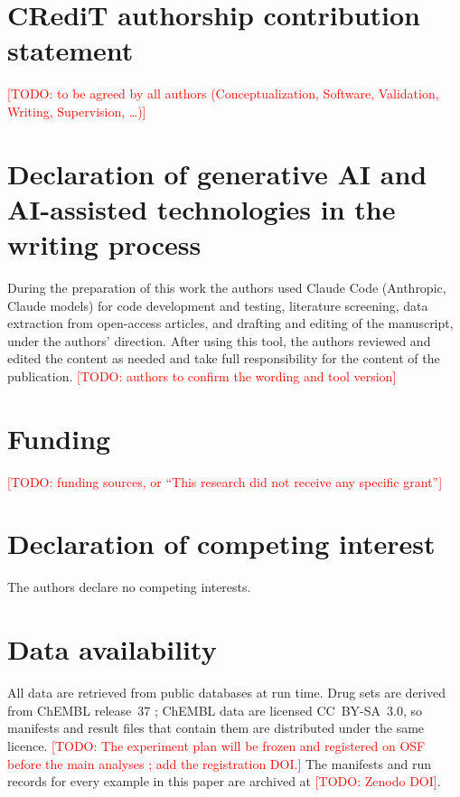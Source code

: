 \documentclass[preprint,12pt]{elsarticle}
\newcommand{\todo}[1]{\textcolor{red}{[TODO: #1]}}
\begin{document}
\section*{CRediT authorship contribution statement}
\todo{to be agreed by all authors (Conceptualization, Software, Validation, Writing, Supervision, \dots)}

\section*{Declaration of generative AI and AI-assisted technologies in the writing process}
During the preparation of this work the authors used Claude Code (Anthropic, Claude models) for code development and testing, literature screening, data extraction from open-access articles, and drafting and editing of the manuscript, under the authors' direction. After using this tool, the authors reviewed and edited the content as needed and take full responsibility for the content of the publication. \todo{authors to confirm the wording and tool version}

\section*{Funding}
\todo{funding sources, or ``This research did not receive any specific grant''}

\section*{Declaration of competing interest}
The authors declare no competing interests.

\section*{Data availability}
All data are retrieved from public databases at run time. Drug sets are derived from ChEMBL release~37 \cite{embl2026chembl37}; ChEMBL data are licensed CC~BY-SA~3.0, so manifests and result files that contain them are distributed under the same licence. \todo{The experiment plan will be frozen and registered on OSF before the main analyses \cite{nosek2018preregistration}; add the registration DOI.} The manifests and run records for every example in this paper are archived at \todo{Zenodo DOI}.



\end{document}
